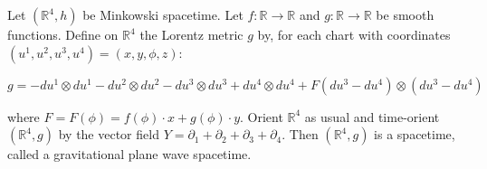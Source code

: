 Let $(\mathbb{R}^4, h)$ be Minkowski spacetime. Let $f: \mathbb{R} \rightarrow \mathbb{R}$ and $g: \mathbb{R} \rightarrow \mathbb{R}$ be smooth functions. Define on $\mathbb{R}^4$ the Lorentz metric $g$ by, for each chart with coordinates $(u^1, u^2, u^3, u^4) = (x, y, \phi, z)$:

$$g = -du^1 \otimes du^1 - du^2 \otimes du^2 - du^3 \otimes du^3 + du^4 \otimes du^4 + F(du^3 - du^4) \otimes (du^3 - du^4)$$

where $F = F(\phi) = f(\phi) \cdot x + g(\phi) \cdot y$. Orient $\mathbb{R}^4$ as usual and time-orient $(\mathbb{R}^4, g)$ by the vector field $Y = \partial_1 + \partial_2 + \partial_3 + \partial_4$. Then $(\mathbb{R}^4, g)$ is a spacetime, called a gravitational plane wave spacetime.
